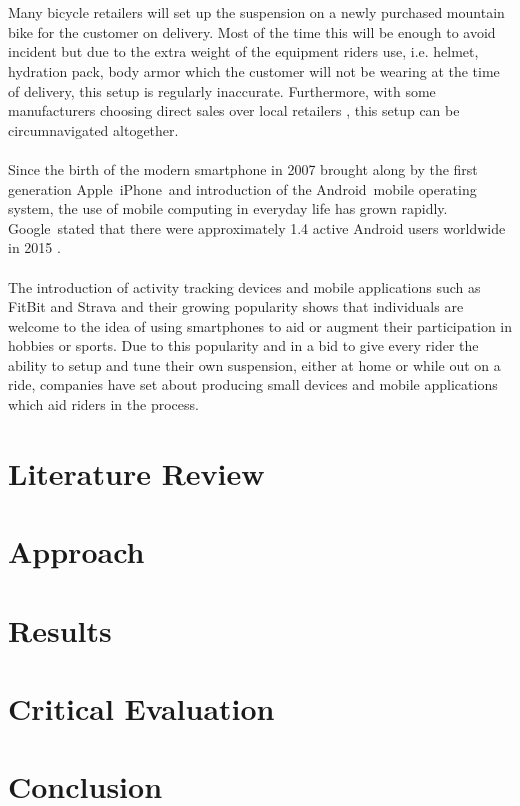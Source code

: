 \documentclass[a4paper, 12pt, hidelinks]{article}
\begin{document}
	\\\\
	Many bicycle retailers will set up the suspension on a newly purchased mountain bike for the customer on delivery. Most of the time this will be enough to avoid incident but due to the extra weight of the equipment riders use, i.e. helmet, hydration pack, body armor which the customer will not be wearing at the time of delivery, this setup is regularly inaccurate. Furthermore, with some manufacturers choosing direct sales over local retailers \citep{roseonline, ytonline}, this setup can be circumnavigated altogether.
	\\\\
	Since the birth of the modern smartphone in 2007 brought along by the first generation Apple\textregistered\ iPhone\textregistered\ and introduction of the Android\texttrademark\ mobile operating system, the use of mobile computing in everyday life has grown rapidly. Google\texttrademark\ stated that there were approximately 1.4 active Android users worldwide in 2015 \citep{androidusers}.
	\\\\
	The introduction of activity tracking devices and mobile applications such as FitBit \citep{fitbit} and Strava \citep{strava} and their growing popularity \citep{apppopularity} shows that individuals are welcome to the idea of using smartphones to aid or augment their participation in hobbies or sports. Due to this popularity and in a bid to give every rider the ability to setup and tune their own suspension, either at home or while out on a ride, companies have set about producing small devices \citep{sussmybike, shockwiztrademark} and mobile applications \citep{foxird} which aid riders in the process. 
	\newpage
	\section{Literature Review}
	\newpage
	\section{Approach}
	\newpage	
	\section{Results}
	\newpage
	\section{Critical Evaluation}
	\newpage
	\section{Conclusion}
	\newpage
		
	\newpage
	\printacronyms
	\printglossary[type=main]
	
\end{document}
